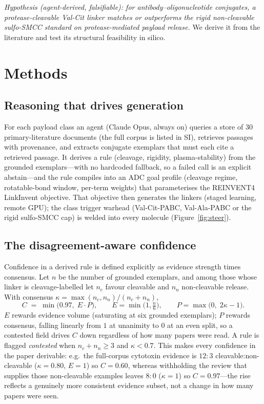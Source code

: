 \documentclass[10pt]{article}
\begin{document}
\noindent\emph{Hypothesis (agent-derived, falsifiable): for antibody--oligonucleotide conjugates, a protease-cleavable Val-Cit linker matches or outperforms the rigid non-cleavable sulfo-SMCC standard on protease-mediated payload release.} We derive it from the literature and test its structural feasibility in silico.
\section{Methods}\subsection{Reasoning that drives generation}
For each payload class an agent (Claude Opus, always on) queries a store of 30 primary-literature documents (the full corpus is listed in SI), retrieves passages with provenance, and extracts conjugate exemplars that must each cite a retrieved passage. It derives a rule (cleavage, rigidity, plasma-stability) from the grounded exemplars---with no hardcoded fallback, so a failed call is an explicit abstain---and the rule compiles into an ADC goal profile (cleavage regime, rotatable-bond window, per-term weights) that parameterises the REINVENT4 LinkInvent objective. That objective then generates the linkers (staged learning, remote GPU); the class trigger warhead (Val-Cit-PABC, Val-Ala-PABC or the rigid sulfo-SMCC cap) is welded into every molecule (Figure~\ref{fig:steer}).

\subsection{The disagreement-aware confidence}
Confidence in a derived rule is defined explicitly as evidence strength times consensus. Let $n$ be the number of grounded exemplars, and among those whose linker is cleavage-labelled let $n_c$ favour cleavable and $n_n$ non-cleavable release. With consensus $\kappa = \max(n_c,n_n)/(n_c+n_n)$,
\begin{equation}
C \;=\; \min\!\big(0.97,\; E\cdot P\big),\qquad E=\min\!\big(1,\tfrac{n}{6}\big),\qquad P=\max\!\big(0,\;2\kappa-1\big).
\end{equation}
$E$ rewards evidence volume (saturating at six grounded exemplars); $P$ rewards consensus, falling linearly from $1$ at unanimity to $0$ at an even split, so a contested field drives $C$ down regardless of how many papers were read. A rule is flagged \emph{contested} when $n_c+n_n\ge 3$ and $\kappa<0.7$. This makes every confidence in the paper derivable: e.g.\ the full-corpus cytotoxin evidence is $12{:}3$ cleavable:non-cleavable ($\kappa=0.80$, $E=1$) so $C=0.60$, whereas withholding the review that supplies those non-cleavable examples leaves $8{:}0$ ($\kappa=1$) so $C=0.97$---the rise reflects a genuinely more consistent evidence subset, not a change in how many papers were seen.
\end{document}
